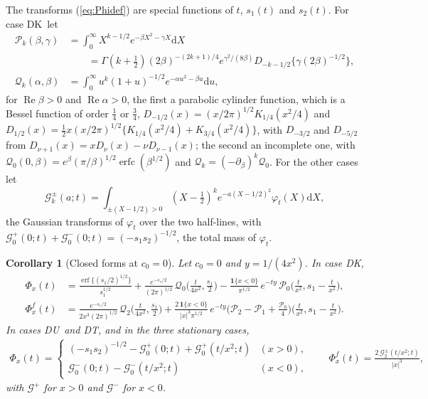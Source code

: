 \documentclass[ecta,nameyear,final]{econsocart}
\newcommand{\dr}[1]{{\mathrm d}#1}
\newcommand{\Rea}{\operatorname{Re}}
\newcommand{\erf}{\operatorname{erf}}
\newcommand{\erfc}{\operatorname{erfc}}
\newcommand{\Fk}{\textsf{\upshape DK}}
\newcommand{\Fu}{\textsf{\upshape DU}}
\newcommand{\Ft}{\textsf{\upshape DT}}
\newcommand{\cP}{\mathcal{P}}
\newcommand{\cQ}{\mathcal{Q}}
\newcommand{\cG}{\mathcal{G}}
\theoremstyle{plain}
\newtheorem{corollary}{Corollary}
\theoremstyle{definition}
\begin{document}
The transforms (\ref{eq:Phidef}) are special functions of $t$, $s_1(t)$ and $s_2(t)$.  For case \Fk\ let
\begin{equation}
\begin{aligned}
\cP_k(\beta,\gamma)&=\int_0^\infty X^{k-1/2}e^{-\beta X^2-\gamma X}\dr{X}\\
&\qquad=\Gamma(k+\tfrac12)(2\beta)^{-(2k+1)/4}e^{\gamma^2/(8\beta)}D_{-k-1/2}\{\gamma(2\beta)^{-1/2}\},\\
\cQ_k(\alpha,\beta)&=\int_0^\infty u^k(1+u)^{-1/2}e^{-\alpha u^2-\beta u}\dr{u},
\end{aligned}
\label{eq:PQ}
\end{equation}
for $\Rea\beta>0$ and $\Rea\alpha>0$, the first a parabolic cylinder function, which is a Bessel function of order $\frac14$ or $\frac34$, $D_{-1/2}(x)=(x/2\pi)^{1/2}K_{1/4}(x^2/4)$ and $D_{1/2}(x)=\frac12x(x/2\pi)^{1/2}\{K_{1/4}(x^2/4)+K_{3/4}(x^2/4)\}$, with $D_{-3/2}$ and $D_{-5/2}$ from $D_{\nu+1}(x)=xD_\nu(x)-\nu D_{\nu-1}(x)$; the second an incomplete one, with $\cQ_0(0,\beta)=e^\beta(\pi/\beta)^{1/2}\erfc(\beta^{1/2})$ and $\cQ_k=(-\partial_\beta)^k\cQ_0$.  For the other cases let
\begin{equation}
\cG^{\pm}_k(a;t)=\int_{\pm(X-1/2)>0}(X-\tfrac12)^ke^{-a(X-1/2)^2}\varphi_t(X)\dr{X},
\label{eq:G}
\end{equation}
the Gaussian transforms of $\varphi_t$ over the two half-lines, with $\cG^+_0(0;t)+\cG^-_0(0;t)=(-s_1s_2)^{-1/2}$, the total mass of $\varphi_t$.

\begin{corollary}[Closed forms at $c_0=0$]
\label{cor:closed}
Let $c_0=0$ and $y=1/(4x^2)$.  In case \Fk,
\begin{align}
\Phi_x(t)&=\frac{\erf\{(s_1/2)^{1/2}\}}{s_1^{1/2}}+\frac{e^{-s_1/2}}{(2\pi)^{1/2}}\,\cQ_0\Big(\frac{t}{4x^2},\frac{s_1}{2}\Big)-\frac{\mathbf{1}\{x<0\}}{\pi^{1/2}}\,e^{-ty}\,\cP_0\Big(\frac{t}{x^2},s_1-\frac{t}{x^2}\Big),\label{eq:PhiK}\\
\Phi^f_x(t)&=\frac{e^{-s_1/2}}{2x^3(2\pi)^{1/2}}\,\cQ_2\Big(\frac{t}{4x^2},\frac{s_1}{2}\Big)+\frac{2\,\mathbf{1}\{x<0\}}{|x|^3\pi^{1/2}}\,e^{-ty}\Big(\cP_2-\cP_1+\frac{\cP_0}{4}\Big)\Big(\frac{t}{x^2},s_1-\frac{t}{x^2}\Big).\label{eq:PhifK}
\end{align}
In cases \Fu\ and \Ft, and in the three stationary cases,
\begin{equation}
\begin{gathered}
\Phi_x(t)=\begin{cases}(-s_1s_2)^{-1/2}-\cG^+_0(0;t)+\cG^+_0(t/x^2;t)&(x>0),\\
\cG^-_0(0;t)-\cG^-_0(t/x^2;t)&(x<0),\end{cases}\qquad
\Phi^f_x(t)=\frac{2\,\cG^{\pm}_2(t/x^2;t)}{|x|^3},
\end{gathered}
\label{eq:PhiUT}
\end{equation}
with $\cG^+$ for $x>0$ and $\cG^-$ for $x<0$.
\end{corollary}
\end{document}
